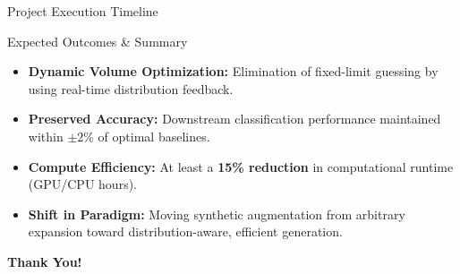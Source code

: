 \documentclass[10pt]{beamer}
\begin{document}
\begin{frame}{Project Execution Timeline}
    \begin{table}[H]
    \centering
    \end{table}
\end{frame}

\begin{frame}{Expected Outcomes \& Summary}
    \begin{itemize}
        \item \textbf{Dynamic Volume Optimization:} Elimination of fixed-limit guessing by using real-time distribution feedback.
        \item \textbf{Preserved Accuracy:} Downstream classification performance maintained within $\pm 2\%$ of optimal baselines.
        \item \textbf{Compute Efficiency:} At least a \textbf{15\% reduction} in computational runtime (GPU/CPU hours).
        \item \textbf{Shift in Paradigm:} Moving synthetic augmentation from arbitrary expansion toward distribution-aware, efficient generation.
    \end{itemize}
\end{frame}

\begin{frame}
    \centering
    \Huge \textbf{Thank You!}
\end{frame}
\end{document}

